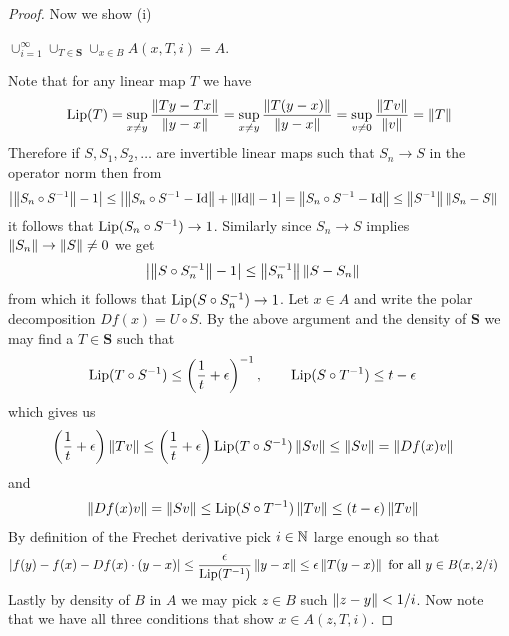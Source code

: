 \begin{proof}
Now we show (i)
\begin{clm} $\cup_{i=1}^\infty \cup_{T \in \mathbf{S}} \cup_{x \in B} A(x,T,i) = A$.
\end{clm}
Note that for any linear map $T$ we have 
\begin{align*}
\operatorname*{Lip}(T) = \sup_{x \neq y} \frac{\left \lVert Ty - Tx \right \rVert}{\left \lVert y-x \right \rVert } = \sup_{x \neq y}\frac{\left \lVert T(y - x) \right \rVert}{\left \lVert y-x \right \rVert} = \sup_{v \neq 0}\frac{\left \lVert Tv \right \rVert}{\left \lVert v \right \rVert} = \left \lVert T \right \rVert
\end{align*}
Therefore if $S, S_1, S_2, \dotsc$ are invertible linear maps such that $S_n \to S$ in the operator norm then from 
\begin{align*}
\left \vert \left \lVert  S_n \circ S^{-1} \right \rVert - 1 \right \vert &\leq \left \vert \left \lVert  S_n \circ S^{-1} - \operatorname*{Id} \right \rVert + \left \lVert \operatorname*{Id} \right \rVert - 1 \right \vert = \left \lVert S_n \circ S^{-1} - \operatorname*{Id} \right \rVert  \leq \left \lVert S^{-1} \right \rVert \left \lVert S_n - S \right \rVert
\end{align*}
it follows that
$\operatorname*{Lip}(S_n \circ S^{-1} ) \to 1$.  Similarly since $S_n \to S$ implies $\left \lVert S_n \right \rVert \to \left \lVert S \right \rVert \neq 0$ we get
\begin{align*}
\left \vert \left \lVert  S \circ S_n^{-1} \right \rVert - 1 \right \vert &\leq \left \lVert S_n^{-1} \right \rVert \left \lVert S - S_n \right \rVert
\end{align*}
from which it follows that $\operatorname*{Lip}(S \circ S_n^{-1} ) \to 1$.  Let $x \in A$ and write the polar decomposition $Df(x) = U \circ S$.  By the above argument and the density of $\mathbf{S}$ we may
find a $T \in \mathbf{S}$ such that 
\begin{align*}
\operatorname*{Lip}(T \circ S^{-1}) &\leq \left( \frac{1}{t} + \epsilon \right)^{-1}, \qquad \operatorname*{Lip}(S \circ T^{-1}) \leq t-\epsilon
\end{align*}
which gives us
\begin{align*}
\left( \frac{1}{t} + \epsilon \right) \left \lVert Tv \right \rVert &\leq \left( \frac{1}{t} + \epsilon \right) \operatorname*{Lip}(T \circ S^{-1}) \left \lVert S v \right \rVert \leq \left \lVert Sv \right \rVert = \left \lVert Df(x) v \right \rVert
\end{align*}
and
\begin{align*}
\left \lVert Df(x) v \right \rVert &= \left \lVert Sv \right \rVert \leq \operatorname*{Lip}(S \circ T^{-1}) \left \lVert T v \right \rVert \leq (t -\epsilon) \left \lVert Tv \right \rVert
\end{align*}
By definition of the Frechet derivative pick $i \in \mathbb{N}$ large enough so that
\begin{align*}
\left \vert f(y) - f(x) - Df(x) \cdot (y-x) \right \vert &\leq \frac{\epsilon}{\operatorname*{Lip}(T^{-1})} \left \lVert y-x \right \rVert \leq \epsilon\left \lVert T(y-x) \right \rVert \text{ for all $y \in B(x,2/i)$}
\end{align*}
Lastly by density of $B$ in $A$ we may pick $z \in B$ such $\left \lVert z - y \right \rVert < 1/i$.  Now note that we have all three conditions that show $x \in A(z,T,i)$.


\end{proof}
